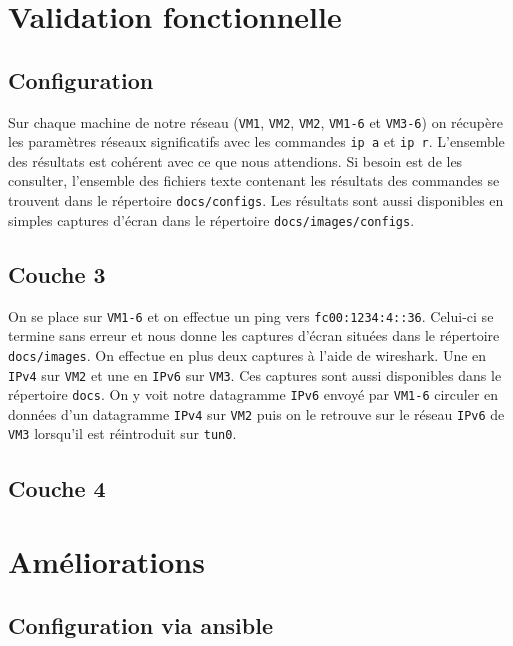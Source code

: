 \documentclass[a4paper, 12pt]{article}
\begin{document}
    \section{Validation fonctionnelle}

    \subsection{Configuration}

    Sur chaque machine de notre réseau (\verb+VM1+, \verb+VM2+, \verb+VM2+, 
    \verb+VM1-6+ et \verb+VM3-6+) on récupère les paramètres réseaux 
    significatifs avec les commandes \verb+ip a+ et \verb+ip r+. L'ensemble 
    des résultats est cohérent avec ce que nous attendions. Si besoin est de
    les consulter, l'ensemble des fichiers texte contenant les résultats des 
    commandes se trouvent dans le répertoire \verb+docs/configs+. Les résultats 
    sont aussi disponibles en simples captures d'écran dans le répertoire 
    \verb+docs/images/configs+.

    \subsection{Couche 3}

    On se place sur \verb+VM1-6+ et on effectue un ping vers \verb+fc00:1234:4::36+.
    Celui-ci se termine sans erreur et nous donne les captures d'écran situées dans 
    le répertoire \verb+docs/images+. On effectue en plus deux captures à l'aide de 
    wireshark. Une en \verb+IPv4+ sur \verb+VM2+ et une en \verb+IPv6+ sur \verb+VM3+.
    Ces captures sont aussi disponibles dans le répertoire \verb+docs+. On y voit 
    notre datagramme \verb+IPv6+ envoyé par \verb+VM1-6+ circuler en données d'un 
    datagramme \verb+IPv4+ sur \verb+VM2+ puis on le retrouve sur le réseau 
    \verb+IPv6+ de \verb+VM3+ lorsqu'il est réintroduit sur \verb+tun0+.

    \subsection{Couche 4}

    \section{Améliorations}

    \subsection{Configuration via ansible}
\end{document}

